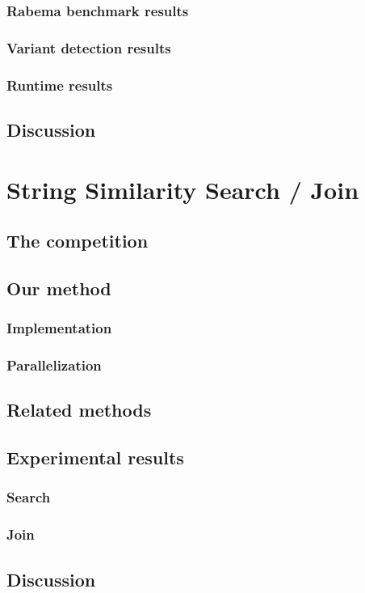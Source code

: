 \subsection{Rabema benchmark results}
\subsection{Variant detection results}
\subsection{Runtime results}
\section{Discussion}

\chapter{String Similarity Search / Join}
\section{The competition}
\section{Our method}
\subsection{Implementation}
\subsection{Parallelization}
\section{Related methods}
\section{Experimental results}
\subsection{Search}
\subsection{Join}
\section{Discussion}
